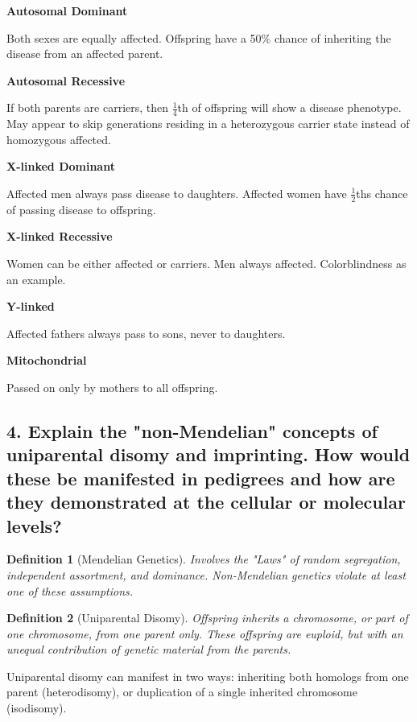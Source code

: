 \documentclass{tufte-handout}
\theoremstyle{noparens}
\newtheorem*{define}{Definition}
\begin{document}
 \noindent
 \textbf{Autosomal Dominant}
 
 Both sexes are equally affected. Offspring have a 50\% chance of inheriting the disease from an affected parent.
 
 \noindent
 \textbf{Autosomal Recessive}
 
 If both parents are carriers, then $\frac{1}{4}$th of offspring will show a disease phenotype. May appear to skip generations residing in a heterozygous carrier state instead of homozygous affected.
 
 \noindent
 \textbf{X-linked Dominant}
 
Affected men always pass disease to daughters. Affected women have $\frac{1}{2}$ths chance of passing disease to offspring.
 
 \noindent
 \textbf{X-linked Recessive}
 
Women can be either affected or carriers. Men always affected. Colorblindness as an example.
 
\noindent
\textbf{Y-linked}

Affected fathers always pass to sons, never to daughters.

\noindent
\textbf{Mitochondrial}

Passed on only by mothers to all offspring.
 
\newpage
\subsection{4. Explain the "non-Mendelian" concepts of uniparental disomy and imprinting. How would these be manifested in pedigrees and how are they demonstrated at the cellular or molecular levels?}
\label{subsec:04}

\begin{define}[Mendelian Genetics]
Involves the "Laws" of random segregation, independent assortment, and dominance. Non-Mendelian genetics violate at least one of these assumptions.
\end{define}

\begin{define}[Uniparental Disomy]
Offspring inherits a chromosome, or part of one chromosome, from one parent only. These offspring are euploid, but with an unequal contribution of genetic material from the parents.
\end{define}

Uniparental disomy can manifest in two ways: inheriting both homologs from one parent (heterodisomy), or duplication of a single inherited chromosome (isodisomy).
\end{document}
